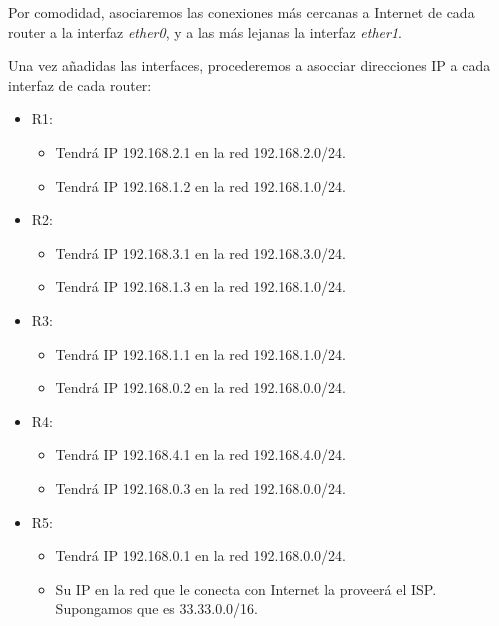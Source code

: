\begin{ejercicio}
    Por comodidad, asociaremos las conexiones más cercanas a Internet de cada router a la interfaz \textit{ether0}, y a las más lejanas la interfaz \textit{ether1}.

    Una vez añadidas las interfaces, procederemos a asocciar direcciones IP a cada interfaz de cada router:
    \begin{itemize}
        \item R1\@:
            \begin{itemize}
                \item Tendrá IP 192.168.2.1 en la red 192.168.2.0/24.
                \item Tendrá IP 192.168.1.2 en la red 192.168.1.0/24.
            \end{itemize}
        \item R2\@:
            \begin{itemize}
                \item Tendrá IP 192.168.3.1 en la red 192.168.3.0/24.
                \item Tendrá IP 192.168.1.3 en la red 192.168.1.0/24.
            \end{itemize}
        \item R3\@:
            \begin{itemize}
                \item Tendrá IP 192.168.1.1 en la red 192.168.1.0/24.
                \item Tendrá IP 192.168.0.2 en la red 192.168.0.0/24.
            \end{itemize}
        \item R4\@: 
            \begin{itemize}
                \item Tendrá IP 192.168.4.1 en la red 192.168.4.0/24.
                \item Tendrá IP 192.168.0.3 en la red 192.168.0.0/24.
            \end{itemize}
        \item R5\@:
            \begin{itemize}
                \item Tendrá IP 192.168.0.1 en la red 192.168.0.0/24.
                \item Su IP en la red que le conecta con Internet la proveerá el \acrshort{ISP}. Supongamos que es 33.33.0.0/16.
            \end{itemize}
    \end{itemize}


\end{ejercicio}
